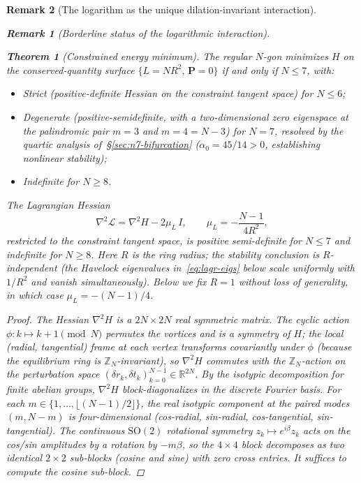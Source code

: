\documentclass[12pt, a4paper]{article}
\newtheorem{theorem}{Theorem}[section]
\newtheorem{remark}{Remark}[section]
\numberwithin{equation}{section}
\begin{document}
\begin{remark}[The logarithm as the unique dilation-invariant interaction]
\begin{remark}[Borderline status of the logarithmic interaction]
\begin{theorem}[Constrained energy minimum]\label{thm:constrained-min}
The regular $N$-gon minimizes $H$ on the conserved-quantity surface
$\{L = NR^2,\, \mathbf{P} = 0\}$ if and only if $N \le 7$, with:
\begin{itemize}
  \item \emph{Strict} (positive-definite Hessian on the constraint
    tangent space) for $N \le 6$;
  \item \emph{Degenerate} (positive-semidefinite, with a two-dimensional
    zero eigenspace at the palindromic pair $m = 3$ and $m = 4 = N{-}3$)
    for $N = 7$, resolved by the
    quartic analysis of~\S\ref{sec:n7-bifurcation}
    ($\alpha_0 = 45/14 > 0$, establishing nonlinear stability);
  \item \emph{Indefinite} for $N \ge 8$.
\end{itemize}
The Lagrangian Hessian
\begin{equation}\label{eq:lagr-hess}
  \nabla^2\!\mathcal{L} = \nabla^2 H - 2\mu_L\, I,
  \qquad \mu_L = -\frac{N-1}{4R^2},
\end{equation}
restricted to the constraint tangent space, is positive semi-definite
for $N \le 7$ and indefinite for $N \ge 8$.
Here $R$ is the ring radius; the stability conclusion is
$R$-independent (the Havelock eigenvalues in~\eqref{eq:lagr-eigs}
below scale uniformly with $1/R^2$ and vanish simultaneously).
Below we fix $R = 1$ without loss of generality, in which case
$\mu_L = -(N{-}1)/4$.
\end{theorem}

\begin{proof}
The Hessian $\nabla^2 H$ is a $2N \times 2N$ real symmetric matrix.
The cyclic action $\phi : k \mapsto k + 1 \pmod N$ permutes the
vortices and is a symmetry of $H$; the local (radial, tangential)
frame at each vertex transforms covariantly under $\phi$ (because
the equilibrium ring is $\mathbb{Z}_N$-invariant), so $\nabla^2 H$
commutes with the $\mathbb{Z}_N$-action on the perturbation space
$(\delta r_k, \delta t_k)_{k=0}^{N-1} \in \mathbb{R}^{2N}$.
By the isotypic decomposition for finite abelian groups,
$\nabla^2 H$ block-diagonalizes in the discrete Fourier basis.
For each $m \in \{1, \ldots, \lfloor (N-1)/2 \rfloor\}$, the
real isotypic component at the paired modes $(m, N-m)$ is
four-dimensional (cos-radial, sin-radial, cos-tangential,
sin-tangential). The continuous $\mathrm{SO}(2)$ rotational symmetry
$z_k \mapsto e^{i\beta}z_k$ acts on the cos/sin amplitudes by a
rotation by $-m\beta$, so the $4 \times 4$ block decomposes as two
identical $2 \times 2$ sub-blocks (cosine and sine) with zero
cross entries. It suffices to compute the cosine sub-block.


\end{proof}
\end{remark}
\end{remark}
\end{document}
